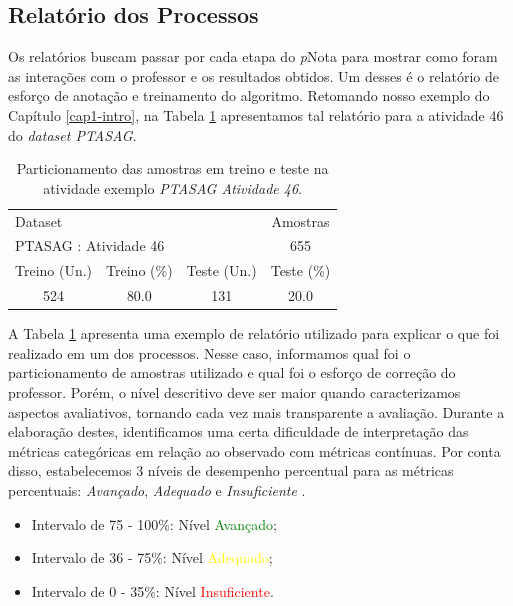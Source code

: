 \subsection{Relatório dos Processos}
\label{subsec-relatorio-processos}

Os relatórios buscam passar por cada etapa do \textit{p}Nota para mostrar como foram as interações com o professor e os resultados obtidos. Um desses é o relatório de esforço de anotação e treinamento do algoritmo. Retomando nosso exemplo do Capítulo \ref{cap1-intro}, na Tabela \ref{tab-ptasag-train-46} apresentamos tal relatório para a atividade 46 do \textit{dataset PTASAG}.

\begin{table}[!b]
\centering
\caption{Particionamento das amostras em treino e teste na atividade exemplo \textit{PTASAG Atividade 46}.}
\label{tab-ptasag-train-46}
\begin{tabular}{|c c c c|} \hline
\multicolumn{3}{|l}{Dataset} & Amostras\\ 

\multicolumn{3}{|l}{PTASAG : Atividade 46} & 655 \\ \hline 

Treino (Un.) & Treino (\%)  & Teste (Un.) & Teste (\%) \\ \hline 

524 & 80.0 & 131 & 20.0 \\ 

\hline \hline
\end{tabular}
\end{table}


A Tabela \ref{tab-ptasag-train-46} apresenta uma exemplo de relatório utilizado para explicar o que foi realizado em um dos processos. Nesse caso, informamos qual foi o particionamento de amostras utilizado e qual foi o esforço de correção do professor. Porém, o nível descritivo deve ser maior quando caracterizamos aspectos avaliativos, tornando cada vez mais transparente a avaliação. Durante a elaboração destes, identificamos uma certa dificuldade de interpretação das métricas categóricas em relação ao observado com métricas contínuas. Por conta disso, estabelecemos 3 níveis de desempenho percentual para as métricas percentuais: \textit{Avançado}, \textit{Adequado} e \textit{Insuficiente} \cite{nascimento2020}.

\begin{itemize}
	\item Intervalo de 75 - 100\%: Nível \textcolor{green}{Avançado};
	\item Intervalo de 36 - 75\%: Nível \textcolor{yellow}{Adequado};
	\item Intervalo de 0 - 35\%: Nível \textcolor{red}{Insuficiente}.
\end{itemize}


